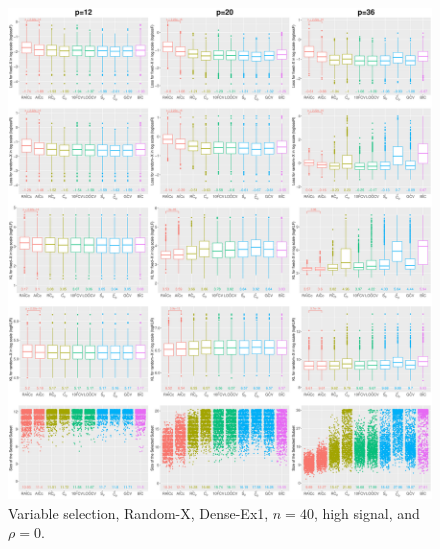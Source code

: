 \begin{figure}[!ht]
\centering
\includegraphics[width=\textwidth]{figures/supplement/randomx/subset_selection/Dense-Ex1_n40_hsnr_rho0.eps}
\caption{Variable selection, Random-X, Dense-Ex1, $n=40$, high signal, and $\rho=0$.}
\end{figure}
\clearpage
